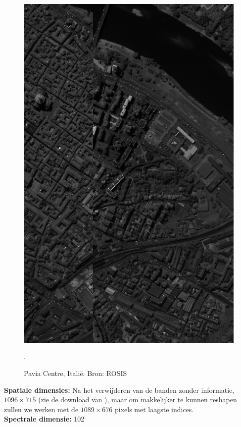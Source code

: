 \begin{figure}[H]
  \centering
  \includegraphics[scale=0.4]{images/pavia_sum.png}
  \caption{Pavia Centre, Itali\"e. Bron: ROSIS \cite{ref:pavia}}.
  \label{fig:pavia_sum}
\end{figure}

\textbf{Spatiale dimensies:} Na het verwijderen van de banden zonder informatie, $1096 \times 715$ (zie de download van \cite{ref:pavia}), maar om makkelijker te kunnen reshapen zullen we werken met de $1089 \times 676$ pixels met laagste indices.\\
\textbf{Spectrale dimensie:} 102